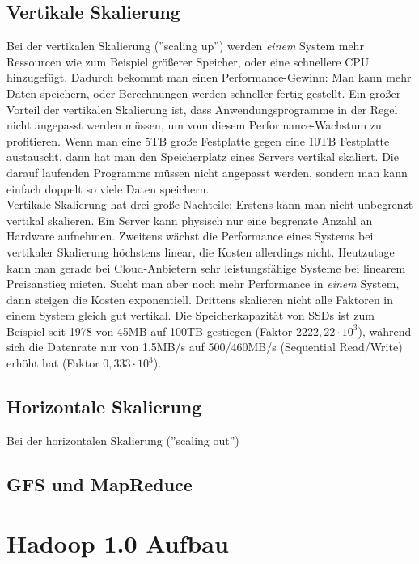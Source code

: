 \subsection{Vertikale Skalierung}
Bei der vertikalen Skalierung (''scaling up'') werden \emph{einem} System mehr Ressourcen wie zum Beispiel größerer Speicher, oder eine schnellere CPU hinzugefügt. Dadurch bekommt man einen Performance-Gewinn: Man kann mehr Daten speichern, oder Berechnungen werden schneller fertig gestellt.
Ein großer Vorteil der vertikalen Skalierung ist, dass Anwendungsprogramme in der Regel nicht angepasst werden müssen, um vom diesem Performance-Wachstum zu profitieren. Wenn man eine 5TB große Festplatte gegen eine 10TB Festplatte austauscht, dann hat man den Speicherplatz eines Servers vertikal skaliert. Die darauf laufenden Programme müssen nicht angepasst werden, sondern man kann einfach doppelt so viele Daten speichern.\cite{beaumont_how_2014}\\
Vertikale Skalierung hat drei große Nachteile: Erstens kann man nicht unbegrenzt vertikal skalieren. Ein Server kann physisch nur eine begrenzte Anzahl an Hardware aufnehmen. Zweitens wächst die Performance eines Systems bei vertikaler Skalierung höchstens linear\cite{gustafson_amdahls_2011}, die Kosten allerdings nicht. Heutzutage kann man gerade bei Cloud-Anbietern sehr leistungsfähige Systeme bei linearem Preisanstieg mieten.\cite{noauthor_pricing_nodate} Sucht man aber noch mehr Performance in \emph{einem} System, dann steigen die Kosten exponentiell\cite{athow_at_2020}. Drittens skalieren nicht alle Faktoren in einem System gleich gut vertikal. Die Speicherkapazität von SSDs ist zum Beispiel seit 1978 von 45MB auf 100TB gestiegen (Faktor $2222,22 \cdot 10^{3}$), während sich die Datenrate nur von 1.5MB/s auf 500/460MB/s (Sequential Read/Write) erhöht hat (Faktor $0,333 \cdot 10^{3}$).\cite{noauthor_who_nodate}\cite{athow_at_2020}  


\subsection{Horizontale Skalierung}
Bei der horizontalen Skalierung (''scaling out'')

\subsection{GFS und MapReduce}
\section{Hadoop 1.0 Aufbau}
